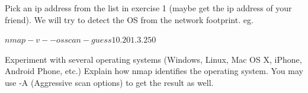 \documentclass[a4paper, 10pt]{article}
\begin{document}
\begin{problem}
Pick an ip address from the list in exercise 1 (maybe get the ip address of your friend).
We will try to detect the OS from the network footprint. eg.
\begin{codingbox}
$ nmap -v --osscan-guess 10.201.3.250
$
\end{codingbox}

Experiment with several operating systems (Windows, Linux, Mac OS X, iPhone, Android Phone, etc.)
Explain how nmap identifies the operating system.
You may use -A (Aggressive scan options) to get the result as well.
\end{problem}
\end{document}
